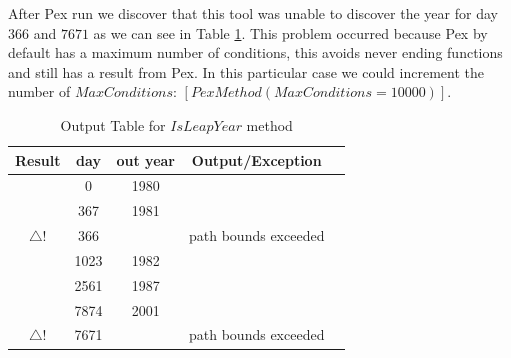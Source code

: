 \documentclass[10pt, conference, compsocconf]{IEEEtran}
\newcommand{\checkK}{\color{ForestGreen}\checkmark}
\newcommand{\bigexclaim}{\color{Dandelion}$\bigtriangleup$\hspace{-5.6pt}!}
\begin{document}
After Pex run we discover that this tool was unable to discover the year for day $366$ and $7671$ as we can see in Table \ref{tab:leap}.
This problem occurred because Pex by default has a maximum number of conditions, this avoids never ending functions and still has a result from Pex.
In this particular case we could increment the number of $MaxConditions$: $[PexMethod(MaxConditions=10000)]$.


\begin{table}[!ht]
\renewcommand{\arraystretch}{1.3}
\caption{Output Table for $IsLeapYear$ method}
\label{tab:leap}
\centering
\noindent \begin{tabular}{|c|c|c|c|c|}\hline
Result & day & out year & Output/Exception\\\hline
\checkK & 0 & 1980 & \\\hline
\checkK & 367 & 1981 & \\\hline
\bigexclaim & 366 & & path bounds exceeded\\\hline
\checkK & 1023 & 1982 &\\\hline
\checkK & 2561 & 1987 & \\\hline
\checkK & 7874 & 2001 & \\\hline
\bigexclaim &  7671 & & path bounds exceeded\\\hline
\end{tabular}
\end{table}
\end{document}
